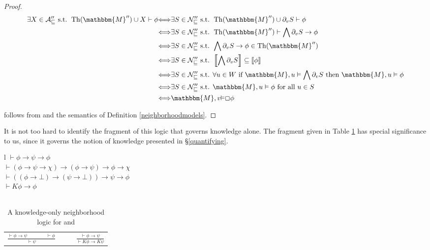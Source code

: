 \begin{proof}
  \begin{align*}
    \text{$\exists X \in \mathcal{A''_v} \text{ s.t. } \tmop{Th}
    (\mathbbm{M}'') \cup X \vdash \phi$} & {\Longleftrightarrow}\text{$\exists
    S \in \mathcal{N''_v} \text{ s.t. } \tmop{Th} (\mathbbm{M}'') \cup
    \partial_v S \vdash \phi$}\\
    & {\Longleftrightarrow}\text{$\exists S \in \mathcal{N''_v} \text{ s.t. }
    \tmop{Th} (\mathbbm{M}'') \vdash \bigwedge \partial_v S \rightarrow
    \phi$}\\
    & {\Longleftrightarrow}\text{$\exists S \in \mathcal{N''_v} \text{ s.t. }
    \bigwedge \partial_v S \rightarrow \phi \in \tmop{Th} (\mathbbm{M}'')$}\\
    & {\Longleftrightarrow}\text{$\exists S \in \mathcal{N''_v} \text{ s.t. }
    \left\llbracket \bigwedge \partial_v S \right\rrbracket \subseteq
    \left\llbracket \phi \right\rrbracket$}\\
    & {\Longleftrightarrow}\text{$\exists S \in \mathcal{N''_v} \text{ s.t.
    $\forall u \in W$ if } \mathbbm{M}, u \vDash \bigwedge \partial_v S \text{
    then } \mathbbm{M}, u \vDash \phi$}\\
    & {\Longleftrightarrow}\text{$\exists S \in \mathcal{N''_v} \text{ s.t. }
    \mathbbm{M}, u \vDash \phi \text{ for all } u \in S$}\\
    & {\Longleftrightarrow}{\mathbbm{M}},v{\vDash}\Box{\phi}
  \end{align*}
  
   follows from  and the semantics of Definition
  \ref{neighborhoodmodels}.
\end{proof}

It is not too hard to identify the fragment of this logic that governs
knowledge alone.  The fragment given in Table \ref{logic4} has special
significance to us, since it governs the notion of knowledge presented in
{\S}\ref{quantifying}.

\begin{table}[h]
  \begin{tabular}{l}
    $\vdash \phi \rightarrow \psi \rightarrow \phi$\\
    $\vdash (\phi \rightarrow \psi \rightarrow \chi) \rightarrow (\phi
    \rightarrow \psi) \rightarrow \phi \rightarrow \chi$\\
    $\vdash ((\phi \rightarrow \bot) \rightarrow (\psi \rightarrow \bot))
    \rightarrow \psi \rightarrow \phi$\\
    $\vdash K \phi \rightarrow \phi$\\
    \\
    \begin{tabular}{llll}
      $\frac{\vdash \phi \rightarrow \psi \hspace{4em} \vdash \phi}{\vdash
      \psi}$ &  &  & $\frac{\vdash \phi \rightarrow \psi}{\vdash K \phi
      \rightarrow K \psi}$
    \end{tabular}
  \end{tabular}
  \caption{\label{logic4}A knowledge-only neighborhood logic for
   and {}}
\end{table}


